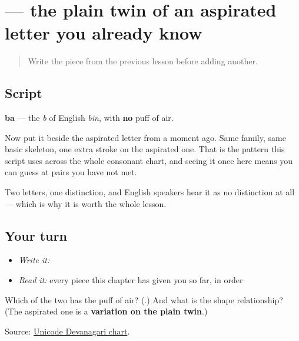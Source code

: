 \section[\texorpdfstring{\hi{ब} (ba)}{ब (ba)}]{ — the plain twin of an aspirated letter you already know}

\label{lesson:HI-W12-ba}



\begin{quote}
Write the piece from the previous lesson before adding another.
\end{quote}

\subsection*{Script}

\begin{quote}
\end{quote}

\textbf{ba} — the \emph{b} of English \emph{bin}, with \textbf{no} puff of air.

Now put it beside the aspirated letter from a moment ago. Same family, same basic skeleton, one extra stroke on the aspirated one. That is the pattern this script uses across the whole consonant chart, and seeing it once here means you can guess at pairs you have not met.

Two letters, one distinction, and English speakers hear it as no distinction at all — which is why it is worth the whole lesson.

\subsection*{Your turn}
\begin{itemize}
\raggedright
  \item \emph{Write it:} 
  \item \emph{Read it:} every piece this chapter has given you so far, in order
\end{itemize}

\begin{tcolorbox}[breakable,colback=teal!4,colframe=teal!35!black,title={Before you move on}]
Which of the two has the puff of air? (\textbf{}.) And what is the shape relationship? (The aspirated one is a \textbf{variation on the plain twin}.)

Source: \href{https://www.unicode.org/charts/PDF/U0900.pdf}{Unicode Devanagari chart}.
\end{tcolorbox}
